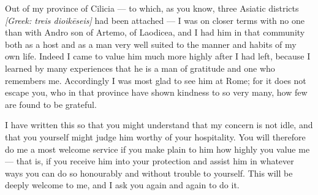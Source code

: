 

 Out of my province of Cilicia --- to which, as you know, three Asiatic districts \textit{[Greek: treis dioikēseis]} had been attached --- I was on closer terms with no one than with Andro son of Artemo, of Laodicea, and I had him in that community both as a host and as a man very well suited to the manner and habits of my own life. Indeed I came to value him much more highly after I had left, because I learned by many experiences that he is a man of gratitude and one who remembers me. Accordingly I was most glad to see him at Rome; for it does not escape you, who in that province have shown kindness to so very many, how few are found to be grateful.

 I have written this so that you might understand that my concern is not idle, and that you yourself might judge him worthy of your hospitality. You will therefore do me a most welcome service if you make plain to him how highly you value me --- that is, if you receive him into your protection and assist him in whatever ways you can do so honourably and without trouble to yourself. This will be deeply welcome to me, and I ask you again and again to do it.
